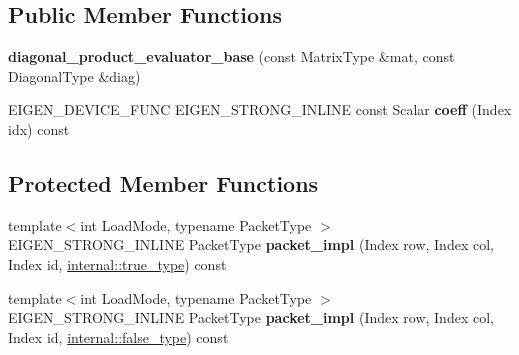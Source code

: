 \subsection*{Public Member Functions}
\begin{DoxyCompactItemize}
\item 
\mbox{\label{struct_eigen_1_1internal_1_1diagonal__product__evaluator__base_a31b91435801db27c9ca20198f0d0facf}} 
{\bfseries diagonal\+\_\+product\+\_\+evaluator\+\_\+base} (const Matrix\+Type \&mat, const Diagonal\+Type \&diag)
\item 
\mbox{\label{struct_eigen_1_1internal_1_1diagonal__product__evaluator__base_a0b502bff8d9694d1ba557b2def781917}} 
E\+I\+G\+E\+N\+\_\+\+D\+E\+V\+I\+C\+E\+\_\+\+F\+U\+NC E\+I\+G\+E\+N\+\_\+\+S\+T\+R\+O\+N\+G\+\_\+\+I\+N\+L\+I\+NE const Scalar {\bfseries coeff} (Index idx) const
\end{DoxyCompactItemize}
\subsection*{Protected Member Functions}
\begin{DoxyCompactItemize}
\item 
\mbox{\label{struct_eigen_1_1internal_1_1diagonal__product__evaluator__base_a0c40c8d14ebec720202430c2b54ccd5c}} 
{\footnotesize template$<$int Load\+Mode, typename Packet\+Type $>$ }\\E\+I\+G\+E\+N\+\_\+\+S\+T\+R\+O\+N\+G\+\_\+\+I\+N\+L\+I\+NE Packet\+Type {\bfseries packet\+\_\+impl} (Index row, Index col, Index id, \mbox{\hyperlink{struct_eigen_1_1internal_1_1true__type}{internal\+::true\+\_\+type}}) const
\item 
\mbox{\label{struct_eigen_1_1internal_1_1diagonal__product__evaluator__base_ad0c8a0b3d0df8990abbab8c091df0bca}} 
{\footnotesize template$<$int Load\+Mode, typename Packet\+Type $>$ }\\E\+I\+G\+E\+N\+\_\+\+S\+T\+R\+O\+N\+G\+\_\+\+I\+N\+L\+I\+NE Packet\+Type {\bfseries packet\+\_\+impl} (Index row, Index col, Index id, \mbox{\hyperlink{struct_eigen_1_1internal_1_1false__type}{internal\+::false\+\_\+type}}) const
\end{DoxyCompactItemize}
